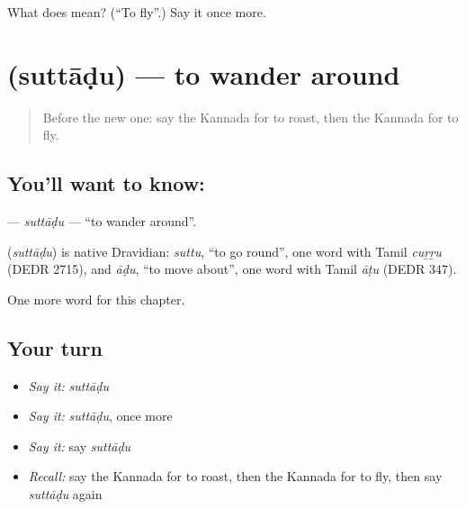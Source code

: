 \begin{tcolorbox}[breakable,colback=teal!4,colframe=teal!35!black,title={Before you move on}]
What does  mean? (\textquotedblleft{}To fly\textquotedblright{}.) Say it once more.
\end{tcolorbox}
\section[\texorpdfstring{\kn{ಸುತ್ತಾಡು} (suttāḍu)}{ಸುತ್ತಾಡು (suttāḍu)}]{ (suttāḍu) — to wander around}

\label{lesson:KA-C273-suttadu}



\begin{quote}
Before the new one: say the Kannada for to roast, then the Kannada for to fly.
\end{quote}

\subsection*{You'll want to know: }
\textbf{} — \emph{suttāḍu} — \textquotedblleft{}to wander around\textquotedblright{}.

\begin{cousinweb}
\textbf{} (\emph{suttāḍu}) is native Dravidian: \emph{suttu}, \textquotedblleft{}to go round\textquotedblright{}, one word with Tamil \emph{cuṟṟu} (DEDR 2715), and \emph{āḍu}, \textquotedblleft{}to move about\textquotedblright{}, one word with Tamil \emph{āṭu} (DEDR 347).
\end{cousinweb}

\begin{grammarlens}[title={What you've built}]
One more word for this chapter.
\end{grammarlens}

\subsection*{Your turn}
\begin{itemize}
\raggedright
  \item \emph{Say it:} \emph{suttāḍu}
  \item \emph{Say it:} \emph{suttāḍu}, once more
  \item \emph{Say it:} say \emph{suttāḍu}
  \item \emph{Recall:} say the Kannada for to roast, then the Kannada for to fly, then say \emph{suttāḍu} again
\end{itemize}

